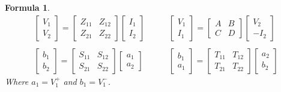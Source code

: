 \documentclass[11pt,landscape]{article}
\newtheorem{formula}[definition]{Formula}
\begin{document}
\begin{multicols}{3}
\begin{formula}
    \begin{align*}
        \begin{bmatrix}V_1 \\ V_2 \end{bmatrix}=\begin{bmatrix}
            Z_{11} & Z_{12} \\ Z_{21} & Z_{22}
        \end{bmatrix}\begin{bmatrix}I_1 \\ I_2 \end{bmatrix}
        \quad & \quad
        \begin{bmatrix}V_1 \\ I_1 \end{bmatrix}=\begin{bmatrix}
            A & B \\ C & D
        \end{bmatrix}\begin{bmatrix}V_2 \\ -I_2 \end{bmatrix} \\
        \\
        \begin{bmatrix}b_1 \\ b_2 \end{bmatrix}=\begin{bmatrix}
            S_{11} & S_{12} \\ S_{21} & S_{22}
        \end{bmatrix}\begin{bmatrix}a_1 \\ a_2 \end{bmatrix}
        \quad & \quad
        \begin{bmatrix}b_1 \\ a_1 \end{bmatrix}=\begin{bmatrix}
            T_{11} & T_{12} \\ T_{21} & T_{22}
        \end{bmatrix}\begin{bmatrix}a_2 \\ b_2 \end{bmatrix}
    \end{align*}
    Where $a_1=V_1^+$ and $b_1=V_1^-$.
\end{formula}


\end{multicols}
\end{document}
